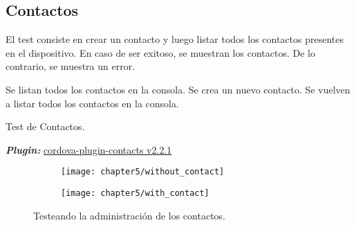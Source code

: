\subsection{Contactos}
El test consiste en crear un contacto y luego listar todos los contactos presentes en el dispositivo. En caso de ser exitoso, se muestran los contactos. De lo contrario, se muestra un error.\\
\begin{algorithm}
	\begin{algorithmic}[1]
		\STATE Se listan todos los contactos en la consola.
		\STATE Se crea un nuevo contacto.
		\STATE Se vuelven a listar todos los contactos en la consola.
	\end{algorithmic}
	\caption{Test de Contactos.}\label{alg:chap5:test_contactos}
\end{algorithm}
\textbf{\emph{Plugin:}} \href{https://www.npmjs.com/package/cordova-plugin-contacts}{cordova-plugin-contacts v2.2.1}
\begin{figure}[hbtp]
    \centering
    \begin{subfigure}{0.3\linewidth}
        \texttt{[image: chapter5/without\_contact]}
        \label{fig:chapter05:without_contact}
    \end{subfigure}
    \begin{subfigure}{0.3\linewidth}
        \texttt{[image: chapter5/with\_contact]}
        \label{fig:chapter05:with_contact}
    \end{subfigure}
    \caption{Testeando la administración de los contactos.}
	\label{fig:ch05:contacts-cases}
\end{figure}
\newpage
